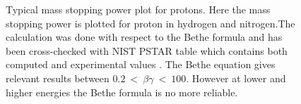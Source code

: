 \begin{figure}[!ht]
	
	\caption[Typical mass stopping power plot for protons]{Typical mass stopping power plot for protons. Here the mass stopping power is plotted for proton in hydrogen and nitrogen.The calculation was done with respect to the Bethe formula and has been cross-checked with NIST PSTAR table which contains both computed and experimental values \cite{Seltzer1993}. The Bethe equation gives relevant results between \(0.2\ <\ \beta\gamma\ <\ 100\). However at lower and higher energies the Bethe formula is no more reliable.}
	\label{chap3:bethe1}
\end{figure}
